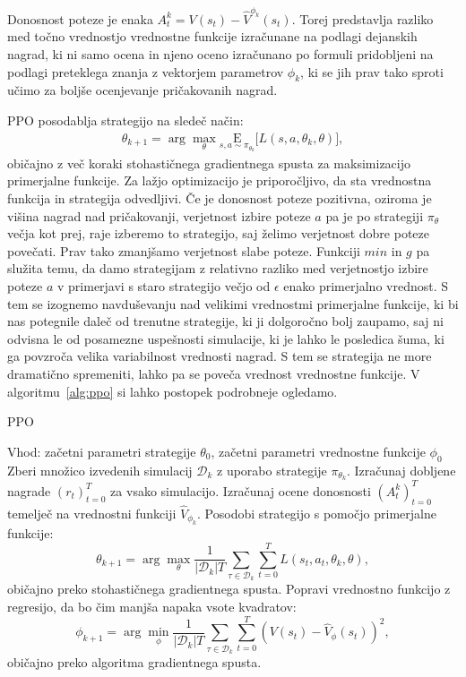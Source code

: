 Donosnost poteze je enaka $A_t^k = V(s_t) - \hat{V}^{\phi_k}(s_t)$. Torej predstavlja razliko med točno vrednostjo vrednostne funkcije izračunane na podlagi dejanskih nagrad, ki ni samo ocena in njeno oceno izračunano po formuli pridobljeni na podlagi preteklega znanja z vektorjem parametrov $\phi_k$, ki se jih prav tako sproti učimo za boljše ocenjevanje pričakovanih nagrad.

PPO posodablja strategijo na sledeč način:
\begin{align}
\theta_{k+1} = \arg \max_{\theta} \underset{s,a \sim \pi_{\theta_k}}{{\mathrm E}}\lbrack
L(s,a,\theta_k, \theta)\rbrack, \label{eq:posodobi}
\end{align}
običajno z več koraki stohastičnega gradientnega spusta za maksimizacijo primerjalne funkcije. Za lažjo optimizacijo je priporočljivo, da sta vrednostna funkcija in strategija odvedljivi. Če je donosnost poteze pozitivna, oziroma je višina nagrad nad pričakovanji, verjetnost izbire poteze $a$ pa je po strategiji $\pi_\theta$ večja kot prej, raje izberemo to strategijo, saj želimo verjetnost dobre poteze povečati. Prav tako zmanjšamo verjetnost slabe poteze. Funkciji $min$ in $g$ pa služita temu, da damo strategijam z relativno razliko med verjetnostjo izbire poteze $a$ v primerjavi s staro strategijo večjo od $\epsilon$ enako primerjalno vrednost. S tem se izognemo navduševanju nad velikimi vrednostmi primerjalne funkcije, ki bi nas potegnile daleč od trenutne strategije, ki ji dolgoročno bolj zaupamo, saj ni odvisna le od posamezne uspešnosti simulacije, ki je lahko le posledica šuma, ki ga povzroča velika variabilnost vrednosti nagrad. S tem se strategija ne more dramatično spremeniti, lahko pa se poveča vrednost vrednostne funkcije. V algoritmu~\ref{alg:ppo} si lahko postopek podrobneje ogledamo.

\begin{algorithm}[ht]
	\caption{PPO}
	\label{alg:ppo}
	\begin{algorithmic}[1]
		\State Vhod: začetni parametri strategije $\theta_0$, začetni parametri vrednostne funkcije $\phi_0$
		\State Zberi množico izvedenih simulacij ${\mathcal D}_k$ z uporabo strategije $\pi_{\theta_{k}}$.
		\State Izračunaj dobljene nagrade $(r_t)_{t=0}^T$ za vsako simulacijo.
		\State Izračunaj ocene donosnosti $(A_t^k)_{t=0}^T$ temelječ na vrednostni funkciji $\hat{V}_{\phi_{k}}$.
		\State Posodobi strategijo s pomočjo primerjalne funkcije:
		\begin{equation*}
		\theta_{k+1} = \arg \max_{\theta} \frac{1}{|{\mathcal D}_k| T} \sum_{\tau \in {\mathcal D}_k} \sum_{t=0}^T L(s_t, a_t, \theta_k, \theta),
		\end{equation*}
		običajno preko stohastičnega gradientnega spusta.
		\State Popravi vrednostno funkcijo z regresijo, da bo čim manjša napaka vsote kvadratov:
		\begin{equation*}
		\phi_{k+1} = \arg \min_{\phi} \frac{1}{|{\mathcal D}_k| T} \sum_{\tau \in {\mathcal D}_k} \sum_{t=0}^T (V(s_t) - \hat{V}_\phi(s_t))^2,
		\end{equation*}
		običajno preko algoritma gradientnega spusta.
		\EndFor
	\end{algorithmic}
\end{algorithm}


